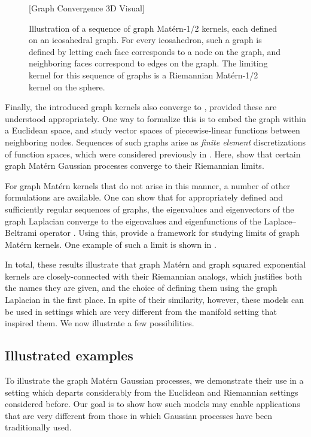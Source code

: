 \documentclass[11pt]{book}
\begin{document}
\begin{figure}
\vspace*{10ex}
[Graph Convergence 3D Visual]
\vspace*{10ex}
\caption{Illustration of a sequence of graph Matérn-1/2 kernels, each defined on an icosahedral graph. For every icosahedron, such a graph is defined by letting each face corresponds to a node on the graph, and neighboring faces correspond to edges on the graph. The limiting kernel for this sequence of graphs is a Riemannian Matérn-1/2 kernel on the sphere.}
\label{fig:graph-limit}
\end{figure}

Finally, the introduced graph kernels also converge to , provided these are understood appropriately.
One way to formalize this is to embed the graph within a Euclidean space, and study vector spaces of piecewise-linear functions between neighboring nodes.
Sequences of such graphs arise as \emph{finite element} discretizations of function spaces, which were considered previously in .
Here, \textcite{lindgren11} show that certain graph Matérn Gaussian processes converge to their Riemannian limits.

For graph Matérn kernels that do not arise in this manner, a number of other formulations are available.
One can show that for appropriately defined and sufficiently regular sequences of graphs, the eigenvalues and eigenvectors of the graph Laplacian converge to the eigenvalues and eigenfunctions of the Laplace--Beltrami operator \cite{belkin07,burago14}.
Using this, \textcite{sanzalonso20} provide a framework for studying limits of graph Matérn kernels.
One example of such a limit is shown in .

In total, these results illustrate that graph Matérn and graph squared exponential kernels are closely-connected with their Riemannian analogs, which justifies both the names they are given, and the choice of defining them using the graph Laplacian in the first place.
In spite of their similarity, however, these models can be used in settings which are very different from the manifold setting that inspired them.
We now illustrate a few possibilities.

\subsection{Illustrated examples}

To illustrate the graph Matérn Gaussian processes, we demonstrate their use in a setting which departs considerably from the Euclidean and Riemannian settings considered before.
Our goal is to show how such models may enable applications that are very different from those in which Gaussian processes have been traditionally used.
\end{document}
